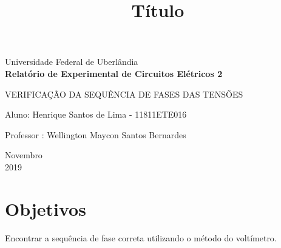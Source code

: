 \documentclass[a4paper, 12pt]{article}
\begin{document}
	\begin{titlepage}
		\begin{center}
			
			\Huge{Universidade Federal de Uberlândia}\\
			\vspace{15pt}
			\vspace{85pt}
			\textbf{\LARGE{Relatório de Experimental de Circuitos Elétricos 2}}
			\title{\large{Título}}
			
		\end{center}
		\vspace{1,5cm}
		\begin{flushright}
			\begin{list}{}{
				\setlength{\leftmargin}{4.5cm}
				\setlength{\rightmargin}{0cm}
				\setlength{\labelwidth}{0pt}
				\setlength{\labelsep}{\leftmargin}}
				\item
				VERIFICAÇÃO DA SEQUÊNCIA DE FASES DAS TENSÕES
				\begin{list}{}{
					\setlength{\leftmargin}{0cm}
					\setlength{\rightmargin}{0cm}
					\setlength{\labelwidth}{0pt}
					\setlength{\labelsep}{\leftmargin}}
					\item Aluno:  Henrique Santos de Lima - 11811ETE016\
					\item Professor : Wellington Maycon Santos Bernardes\
				\end{list}
			\end{list}
		\end{flushright}
		\vspace{1cm}
		\begin{center}
			\vspace{\fill}
			Novembro\\
			2019
		\end{center}
	\end{titlepage}
	\tableofcontents
	\thispagestyle{empty}
	\newpage
	\section{Objetivos}
		\justifying
		Encontrar a sequência de fase correta utilizando o método do voltímetro.
\end{document}
